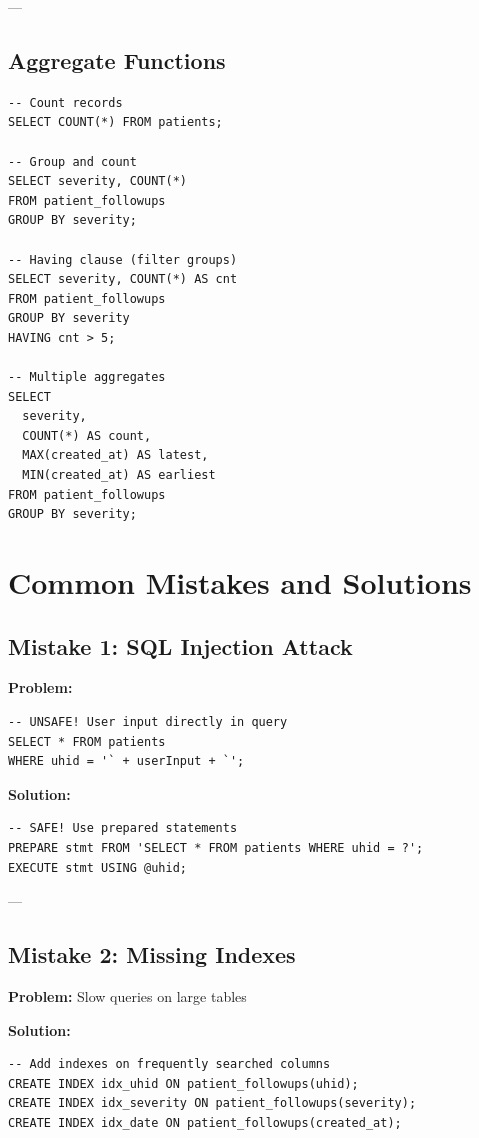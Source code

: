 \documentclass[12pt,a4paper]{article}
\begin{document}
---

\subsection{Aggregate Functions}

\begin{lstlisting}[caption={Aggregation}]
-- Count records
SELECT COUNT(*) FROM patients;

-- Group and count
SELECT severity, COUNT(*) 
FROM patient_followups 
GROUP BY severity;

-- Having clause (filter groups)
SELECT severity, COUNT(*) AS cnt
FROM patient_followups 
GROUP BY severity
HAVING cnt > 5;

-- Multiple aggregates
SELECT 
  severity,
  COUNT(*) AS count,
  MAX(created_at) AS latest,
  MIN(created_at) AS earliest
FROM patient_followups
GROUP BY severity;
\end{lstlisting}

\section{Common Mistakes and Solutions}

\subsection{Mistake 1: SQL Injection Attack}

\textbf{Problem:}
\begin{lstlisting}
-- UNSAFE! User input directly in query
SELECT * FROM patients 
WHERE uhid = '` + userInput + `';
\end{lstlisting}

\textbf{Solution:}
\begin{lstlisting}
-- SAFE! Use prepared statements
PREPARE stmt FROM 'SELECT * FROM patients WHERE uhid = ?';
EXECUTE stmt USING @uhid;
\end{lstlisting}

---

\subsection{Mistake 2: Missing Indexes}

\textbf{Problem:} Slow queries on large tables

\textbf{Solution:}
\begin{lstlisting}
-- Add indexes on frequently searched columns
CREATE INDEX idx_uhid ON patient_followups(uhid);
CREATE INDEX idx_severity ON patient_followups(severity);
CREATE INDEX idx_date ON patient_followups(created_at);
\end{lstlisting}
\end{document}
